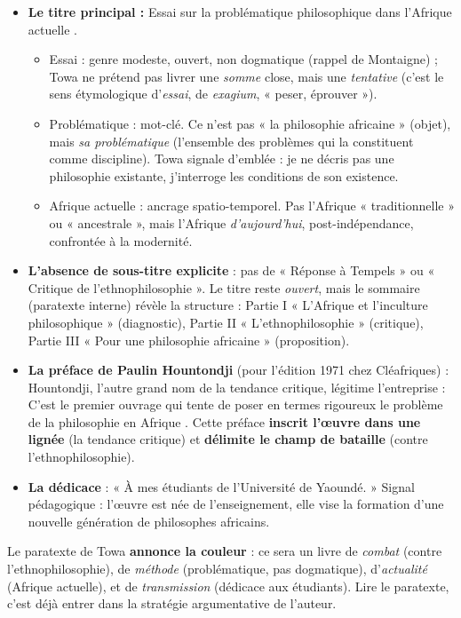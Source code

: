 \documentclass[11pt]{article}
\newcommand{\cle}[1]{{\popxbold\color{popdark}#1}}
\begin{document}
\begin{itemize}
\item \textbf{Le titre principal :} \guillemotleft Essai sur la problématique philosophique dans l'Afrique actuelle \guillemotright.
      \begin{itemize}
      \item \cle{Essai} : genre modeste, ouvert, non dogmatique (rappel de Montaigne) ; Towa ne prétend pas livrer une \emph{somme} close, mais une \emph{tentative} (c'est le sens étymologique d'\emph{essai}, de \emph{exagium}, « peser, éprouver »).
      \item \cle{Problématique} : mot-clé. Ce n'est pas « la philosophie africaine » (objet), mais \emph{sa problématique} (l'ensemble des problèmes qui la constituent comme discipline). Towa signale d'emblée : je ne décris pas une philosophie existante, j'interroge les conditions de son existence.
      \item \cle{Afrique actuelle} : ancrage spatio-temporel. Pas l'Afrique « traditionnelle » ou « ancestrale », mais l'Afrique \emph{d'aujourd'hui}, post-indépendance, confrontée à la modernité.
      \end{itemize}
\item \textbf{L'absence de sous-titre explicite} : pas de « Réponse à Tempels » ou « Critique de l'ethnophilosophie ». Le titre reste \emph{ouvert}, mais le sommaire (paratexte interne) révèle la structure : Partie I « L'Afrique et l'inculture philosophique » (diagnostic), Partie II « L'ethnophilosophie » (critique), Partie III « Pour une philosophie africaine » (proposition).
\item \textbf{La préface de Paulin Hountondji} (pour l'édition 1971 chez Cléafriques) : Hountondji, l'autre grand nom de la tendance critique, légitime l'entreprise : \guillemotleft C'est le premier ouvrage qui tente de poser en termes rigoureux le problème de la philosophie en Afrique \guillemotright. Cette préface \textbf{inscrit l'œuvre dans une lignée} (la tendance critique) et \textbf{délimite le champ de bataille} (contre l'ethnophilosophie).
\item \textbf{La dédicace} : « À mes étudiants de l'Université de Yaoundé. » Signal pédagogique : l'œuvre est née de l'enseignement, elle vise la \cle{formation} d'une nouvelle génération de philosophes africains.
\end{itemize}

\begin{aretenir}
Le paratexte de Towa \textbf{annonce la couleur} : ce sera un livre de \emph{combat} (contre l'ethnophilosophie), de \emph{méthode} (problématique, pas dogmatique), d'\emph{actualité} (Afrique actuelle), et de \emph{transmission} (dédicace aux étudiants). Lire le paratexte, c'est déjà entrer dans la \cle{stratégie argumentative} de l'auteur.
\end{aretenir}
\end{document}
